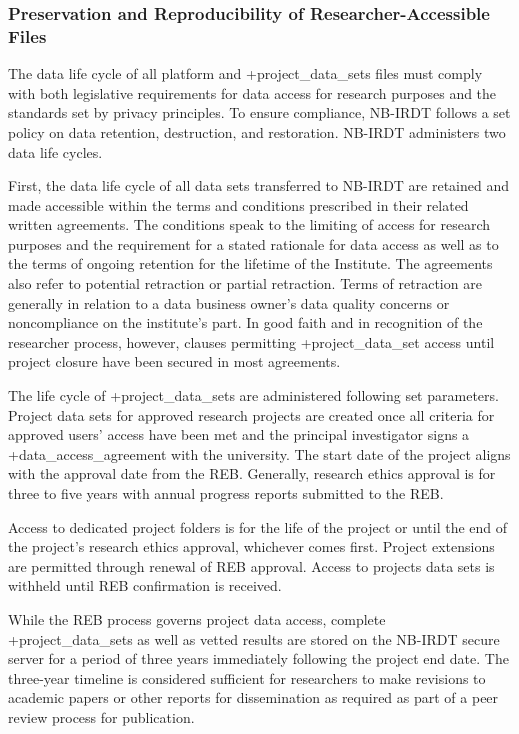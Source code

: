 \documentclass[
]{WileySix}
\begin{document}
\hypertarget{preservation-and-reproducibility-of-researcher-accessible-files-1}{%
\subsubsection{Preservation and Reproducibility of Researcher-Accessible Files}\label{preservation-and-reproducibility-of-researcher-accessible-files-1}}

The data life cycle of all platform and +project\_data\_sets\textbar{} files must comply with both legislative requirements for data access for research purposes and the standards set by privacy principles. To ensure compliance, NB-IRDT follows a set policy on data retention, destruction, and restoration. NB-IRDT administers two data life cycles.

First, the data life cycle of all data sets transferred to NB-IRDT are retained and made accessible within the terms and conditions prescribed in their related written agreements. The conditions speak to the limiting of access for research purposes and the requirement for a stated rationale for data access as well as to the terms of ongoing retention for the lifetime of the Institute. The agreements also refer to potential retraction or partial retraction. Terms of retraction are generally in relation to a data business owner's data quality concerns or noncompliance on the institute's part. In good faith and in recognition of the researcher process, however, clauses permitting +project\_data\_set\textbar{} access until project closure have been secured in most agreements.

The life cycle of +project\_data\_sets\textbar{} are administered following set parameters. Project data sets for approved research projects are created once all criteria for approved users' access have been met and the principal investigator signs a +data\_access\_agreement\textbar{} with the university. The start date of the project aligns with the approval date from the REB. Generally, research ethics approval is for three to five years with annual progress reports submitted to the REB.

Access to dedicated project folders is for the life of the project or until the end of the project's research ethics approval, whichever comes first. Project extensions are permitted through renewal of REB approval. Access to projects data sets is withheld until REB confirmation is received.

While the REB process governs project data access, complete +project\_data\_sets\textbar{} as well as vetted results are stored on the NB-IRDT secure server for a period of three years immediately following the project end date. The three-year timeline is considered sufficient for researchers to make revisions to academic papers or other reports for dissemination as required as part of a peer review process for publication.
\end{document}
